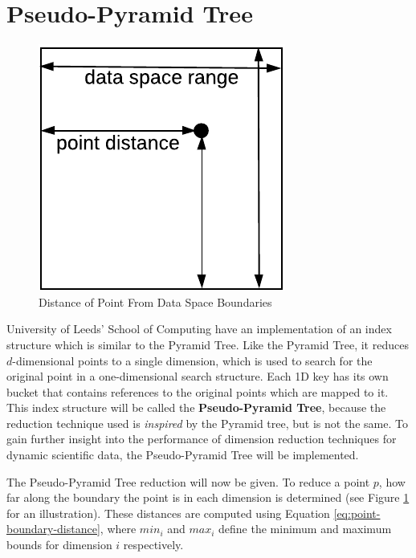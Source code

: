 \section{Pseudo-Pyramid Tree}

\begin{figure}
	\vspace{-15pt}
	\begin{center}
		\includegraphics[scale=0.7]{figures/pseudo-pyramid_tree_point_boundary_distances.pdf}
	\end{center}
	\vspace{-15pt}
	\caption{Distance of Point From Data Space Boundaries}
	\label{fig:point-boundary-distance}
\end{figure}

University of Leeds' School of Computing have an implementation of an index structure which is similar to the Pyramid Tree. Like the Pyramid Tree, it reduces $d$-dimensional points to a single dimension, which is used to search for the original point in a one-dimensional search structure. Each 1D key has its own bucket that contains references to the original points which are mapped to it. This index structure will be called the \textbf{Pseudo-Pyramid Tree}, because the reduction technique used is \textit{inspired} by the Pyramid tree, but is not the same.  To gain further insight into the performance of dimension reduction techniques for dynamic scientific data, the Pseudo-Pyramid Tree will be implemented.

The Pseudo-Pyramid Tree reduction will now be given. To reduce a point $p$, how far along the boundary the point is in each dimension is determined (see Figure \ref{fig:point-boundary-distance} for an illustration). These distances are computed using Equation \ref{eq:point-boundary-distance}, where $min_i$ and $max_i$ define the minimum and maximum bounds for dimension $i$ respectively.

